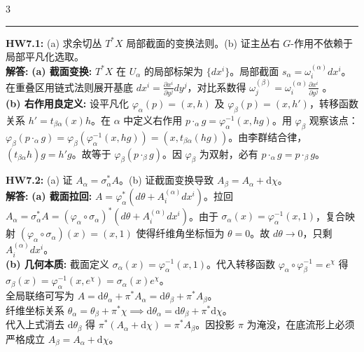 \documentclass[9pt,a4paper]{article} %
\newcommand{\p}{\partial}
\newcommand{\diff}{\mathrm{d}}
\begin{document}
\begin{multicols*}{3}
\vspace{1ex}\hrule\vspace{1ex}

\noindent\textbf{HW7.1:} (a) 求余切丛 $T^*X$ 局部截面的变换法则。(b) 证主丛右 $G$-作用不依赖于局部平凡化选取。\\
\textbf{解答:} 
\textbf{(a) 截面变换:} $T^*X$ 在 $U_\alpha$ 的局部标架为 $\{dx^i\}$。局部截面 $s_\alpha = \omega_i^{(\alpha)}dx^i$。在重叠区用链式法则展开基底 $dx^i = \frac{\p x^i}{\p y^j}dy^j$，对比系数得 $\omega_j^{(\beta)} = \omega_i^{(\alpha)}\frac{\p x^i}{\p y^j}$ 。\\
\textbf{(b) 右作用良定义:} 设平凡化 $\varphi_\alpha(p)=(x,h)$ 及 $\varphi_\beta(p)=(x,h')$，转移函数关系 $h'=t_{\beta\alpha}(x)h$。在 $\alpha$ 中定义右作用 $p \cdot_\alpha g = \varphi_\alpha^{-1}(x,hg)$。用 $\varphi_\beta$ 观察该点：\\
$\varphi_\beta(p \cdot_\alpha g) = \varphi_\beta(\varphi_\alpha^{-1}(x,hg)) = (x, t_{\beta\alpha}(hg))$。由李群结合律，$(t_{\beta\alpha}h)g = h'g$。故等于 $\varphi_\beta(p \cdot_\beta g)$。因 $\varphi_\beta$ 为双射，必有 $p \cdot_\alpha g = p \cdot_\beta g$。

\vspace{0.5ex}
\noindent\textbf{HW7.2:} (a) 证 $A_\alpha = \sigma_\alpha^* A$。(b) 证截面变换导致 $A_\beta = A_\alpha + \diff\chi$。\\
\textbf{解答:} 
\textbf{(a) 截面拉回:} $A = \varphi_\alpha^*(d\theta + A_i^{(\alpha)}dx^i)$。拉回 $A_\alpha = \sigma_\alpha^* A = (\varphi_\alpha \circ \sigma_\alpha)^*(d\theta + A_i^{(\alpha)}dx^i)$。由于 $\sigma_\alpha(x) = \varphi_\alpha^{-1}(x,1)$，复合映射 $(\varphi_\alpha \circ \sigma_\alpha)(x) = (x,1)$ 使得纤维角坐标恒为 $\theta=0$。故 $d\theta \to 0$，只剩 $A_i^{(\alpha)}dx^i$。\\
\textbf{(b) 几何本质:} 截面定义 $\sigma_\alpha(x) = \varphi_\alpha^{-1}(x,1)$。代入转移函数 $\varphi_\alpha \circ \varphi_\beta^{-1} = e^\chi$ 得 $\sigma_\beta(x) = \varphi_\alpha^{-1}(x, e^\chi) = \sigma_\alpha(x)e^\chi$。\\
全局联络可写为 $A = \diff\theta_\alpha + \pi^* A_\alpha = \diff\theta_\beta + \pi^* A_\beta$。\\
纤维坐标关系 $\theta_\alpha = \theta_\beta + \pi^*\chi \implies \diff\theta_\alpha = \diff\theta_\beta + \pi^*\diff\chi$。\\
代入上式消去 $\diff\theta_\beta$ 得 $\pi^*(A_\alpha + \diff\chi) = \pi^* A_\beta$。因投影 $\pi$ 为淹没，在底流形上必须严格成立 $A_\beta = A_\alpha + \diff\chi$。


\end{multicols*}
\end{document}
